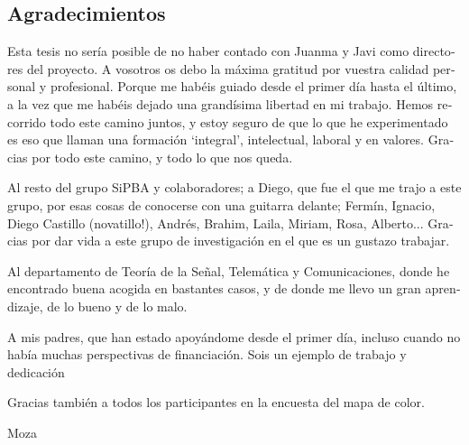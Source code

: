 

\begin{otherlanguage}{spanish}
\chapter*{Agradecimientos}
Esta tesis no sería posible de no haber contado con Juanma y Javi como directores del proyecto. A vosotros os debo la máxima gratitud por vuestra calidad personal y profesional. Porque me habéis guiado desde el primer día hasta el último, a la vez que me habéis dejado una grandísima libertad en mi trabajo. Hemos recorrido todo este camino juntos, y estoy seguro de que lo que he experimentado es eso que llaman una formación `integral', intelectual, laboral y en valores. Gracias por todo este camino, y todo lo que nos queda. 

Al resto del grupo SiPBA y colaboradores; a Diego, que fue el que me trajo a este grupo, por esas cosas de conocerse con una guitarra delante; Fermín, Ignacio, Diego Castillo (novatillo!), Andrés, Brahim, Laila, Miriam, Rosa, Alberto... Gracias por dar vida a este grupo de investigación en el que es un gustazo trabajar. 

Al departamento de Teoría de la Señal, Telemática y Comunicaciones, donde he encontrado buena acogida en bastantes casos, y de donde me llevo un gran aprendizaje, de lo bueno y de lo malo. 


A mis padres, que han estado apoyándome desde el primer día, incluso cuando no había muchas perspectivas de financiación. Sois un ejemplo de trabajo y dedicación 


Gracias también a todos los participantes en la encuesta del mapa de color.

Moza
\end{otherlanguage}
%

